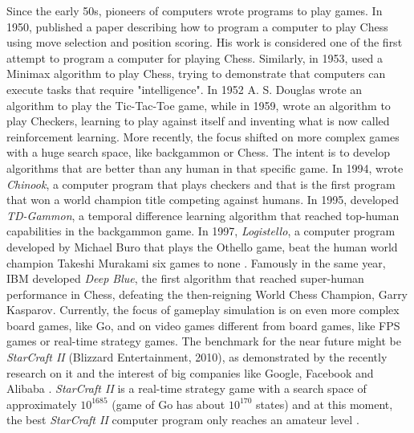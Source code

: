 Since the early 50s, pioneers of computers wrote programs to play games. 
In 1950, \textcite{shannon_xxii._1950} published a paper describing how to program a computer to play Chess using move selection and position scoring. His work is considered one of the first attempt to program a computer for playing Chess. Similarly, in 1953, \textcite{turing_digital_1953} used a Minimax algorithm to play Chess, trying to demonstrate that computers can execute tasks that require "intelligence".
In 1952 A. S. Douglas wrote an algorithm to play the Tic-Tac-Toe game, while  in 1959, \textcite{samuel_studies_1959} wrote an algorithm to play Checkers, learning to play against itself and inventing what is now called reinforcement learning. More recently, the focus shifted on more complex games with a huge search space, like backgammon or Chess. The intent is to develop algorithms that are better than any human in that specific game. In 1994, \textcite{schaeffer_chinook_1996} wrote \textit{Chinook}, a computer program that plays checkers and that is the first program that won a world champion title competing against humans. In 1995,  \textcite{tesauro_temporal_1995} developed \textit{TD-Gammon}, a temporal difference learning algorithm that reached top-human capabilities in the backgammon game. In 1997, \textit{Logistello}, a computer program developed by Michael Buro that plays the Othello game, beat the human world champion Takeshi Murakami six games to none \cite{buro_othello_1997}.
Famously in the same year, IBM \cite{campbell_deep_2002} developed \textit{Deep Blue}, the first algorithm that reached super-human performance in Chess, defeating the then-reigning World Chess Champion, Garry Kasparov. Currently, the focus of gameplay simulation is on even more complex board games, like Go, and on video games different from board games, like \acf{FPS} games or real-time strategy games. The benchmark for the near future might be \textit{StarCraft II} (Blizzard Entertainment, 2010), as demonstrated by the recently research on it \cite{ontanon_survey_2013} and the interest of big companies like Google, Facebook \cite{synnaeve_torchcraft:_2016,usunier_episodic_2016} and Alibaba \cite{peng_multiagent_2017}. \textit{StarCraft II} is a real-time strategy game with a search space of approximately $10^{1685}$ \cite{usunier_episodic_2016} (game of Go has about $10^{170}$ states) and at this moment, the best \textit{StarCraft II} computer program only reaches an amateur level \cite{yannakakis_artificial_2017}.



